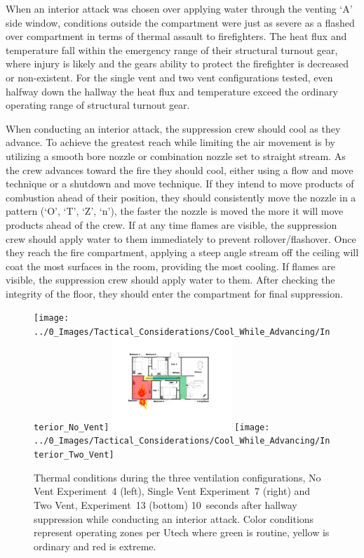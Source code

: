 \documentclass[12pt,oneside]{book}
\begin{document}
When an interior attack was chosen over applying water through the venting `A' side window, conditions outside the compartment were just as severe as a flashed over compartment in terms of thermal assault to firefighters. The heat flux and temperature fall within the emergency range of their structural turnout gear, where injury is likely and the gears ability to protect the firefighter is decreased or non-existent.  For the single vent and two vent configurations tested, even halfway down the hallway the heat flux and temperature exceed the ordinary operating range of structural turnout gear.

When conducting an interior attack, the suppression crew should cool as they advance. To achieve the greatest reach while limiting the air movement is by utilizing a smooth bore nozzle or combination nozzle set to straight stream. As the crew advances toward the fire they should cool, either using a flow and move technique or a shutdown and move technique. If they intend to move products of combustion ahead of their position, they should consistently move the nozzle in a pattern (`O', `T', `Z', `n'), the faster the nozzle is moved the more it will move products ahead of the crew. If at any time flames are visible, the suppression crew should apply water to them immediately to prevent rollover/flashover. Once they reach the fire compartment, applying a steep angle stream off the ceiling will coat the most surfaces in the room, providing the most cooling. If flames are visible, the suppression crew should apply water to them. After checking the integrity of the floor, they should enter the compartment for final suppression.

\begin{figure}[H]
\centering
\texttt{[image: ../0\_Images/Tactical\_Considerations/Cool\_While\_Advancing/Interior\_No\_Vent]}
\includegraphics[width=0.4\textwidth]{../0_Images/Tactical_Considerations/Cool_While_Advancing/Interior_Single_Vent}
\texttt{[image: ../0\_Images/Tactical\_Considerations/Cool\_While\_Advancing/Interior\_Two\_Vent]}
\caption[Thermal Conditions - Interior Attack]{Thermal conditions during the three ventilation configurations, No Vent Experiment~4 (left), Single Vent Experiment~7 (right) and Two Vent, Experiment~13 (bottom) 10~seconds after hallway suppression while conducting an interior attack. Color conditions represent operating zones per Utech \cite{Utech_Firefighter_Clothing} where green is routine, yellow is ordinary and red is extreme.}
\label{fig:Thermal_Classes_Approach_Interior}
\end{figure}
\end{document}

